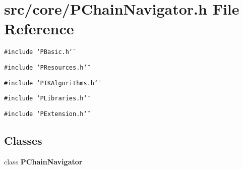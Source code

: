 \section{src/core/PChain\-Navigator.h File Reference}
\label{PChainNavigator_8h}


{\tt \#include \char`\"{}PBasic.h\char`\"{}}\par
{\tt \#include \char`\"{}PResources.h\char`\"{}}\par
{\tt \#include \char`\"{}PIKAlgorithms.h\char`\"{}}\par
{\tt \#include \char`\"{}PLibraries.h\char`\"{}}\par
{\tt \#include \char`\"{}PExtension.h\char`\"{}}\par
\subsection*{Classes}
\begin{CompactItemize}
\item 
class {\bf PChain\-Navigator}
\end{CompactItemize}
